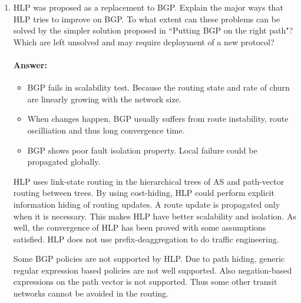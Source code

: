 \documentclass[a4paper,11pt]{article}
\theoremstyle{mytheor}
\begin{document}
\begin{enumerate}
\item
HLP was proposed as a replacement to BGP. 
Explain the major ways that HLP tries to improve on BGP. 
To what extent can these problems can be solved by the simpler solution proposed in ``Putting BGP on the
right path"? 
Which are left unsolved and may require deployment of a new protocol?
\paragraph{Answer:}
\begin{itemize}
\item BGP fails in scalability test. 
Because the routing state and rate of churn are linearly growing with the network size.
\item When changes happen, BGP usually suffers from route instability, route oscilliation and thus long convergence time.
\item BGP shows poor fault isolation property.
Local failure could be propagated globally.
\end{itemize}

HLP uses link-state routing in the hierarchical trees of AS and path-vector routing between trees.
By using cost-hiding, HLP could perform explicit information hiding of routing updates.
A route update is propagated only when it is necessary.
This makes HLP have better scalability and isolation.
As well, the convergence of HLP has been proved with some assumptions satisfied.
HLP does not use prefix-deaggregation to do traffic engineering.

Some BGP policies are not supported by HLP.
Due to path hiding, generic regular expression based policies are not well supported.
Also negation-based expressions on the path vector is not supported. 
Thus some other transit networks cannot be avoided in the routing.

\end{enumerate}
\end{document}
